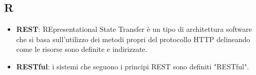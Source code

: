 \subsection{R}
\begin{itemize}
\item
\textbf{REST}: REpresentational State Transfer è un tipo di architettura software che si basa sull'utilizzo dei metodi propri del protocollo HTTP delineando come le risorse sono definite e indirizzate.
\item
\textbf{RESTful}: i sistemi che seguono i principi REST sono definiti "RESTful".
\end{itemize}